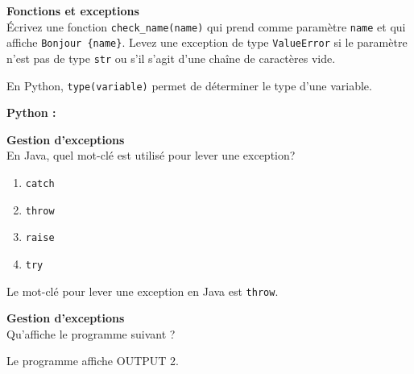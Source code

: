  \begin{Exercice}[10 minutes] [Python] \textbf{Fonctions et exceptions}\\
    Écrivez une fonction \lstinline{check_name(name)} qui prend comme paramètre \lstinline{name} et qui affiche \texttt{Bonjour \{name\}}.
    Levez une exception de type \lstinline{ValueError} si le paramètre n'est pas de type \lstinline{str} ou s'il s'agit d'une chaîne de caractères vide.

    \begin{conseil}
        En Python, \lstinline{type(variable)} permet de déterminer le type d'une variable.
    \end{conseil}
    
    \begin{solution}   
        \textbf{Python :}
        
    \end{solution}
    
    \end{Exercice}

\begin{Exercice}[5 minutes] [Java] \textbf{Gestion d'exceptions}\\

    En Java, quel mot-clé est utilisé pour lever une exception?

    \begin{enumerate}
        \item \texttt{catch}
        \item \texttt{throw}
        \item \texttt{raise} 
        \item \texttt{try}
    \end{enumerate}
    
    \begin{solution}   
    Le mot-clé pour lever une exception en Java est \lstinline{throw}.
        
    \end{solution}
        
 \end{Exercice}

 \begin{Exercice}[5 minutes] [Java] \textbf{Gestion d'exceptions}\\
    Qu'affiche le programme suivant ?
    
        
        \begin{solution}   
        Le programme affiche OUTPUT 2.             
        \end{solution}
        
 \end{Exercice}




